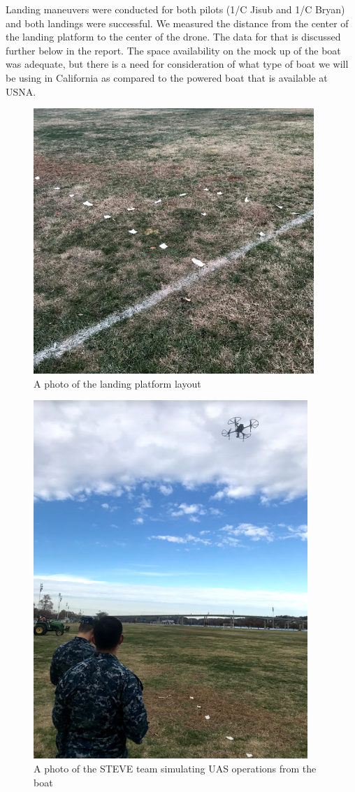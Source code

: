 \documentclass{wrcecapstone}
\begin{document}
Landing maneuvers were conducted for both pilots (1/C Jisub and 1/C Bryan) and both landings were successful. We measured the distance from the center of the landing platform to the center of the drone. The data for that is discussed further below in the report. The space availability on the mock up of the boat was adequate, but there is a need for consideration of what type of boat we will be using in California as compared to the powered boat that is available at USNA. 
\begin{figure}
\begin{center}
\includegraphics[width=0.5\columnwidth]{figures/fig921.png}
\end{center}
\caption{A photo of the landing platform layout}
\label{fig:9.2.1}
\end{figure}
\begin{figure}
\begin{center}
\includegraphics[width=0.5\columnwidth]{figures/fig922.png}
\end{center}
\caption{A photo of the STEVE team simulating UAS operations from the boat}
\label{fig:9.2.2}
\end{figure}
\end{document}
